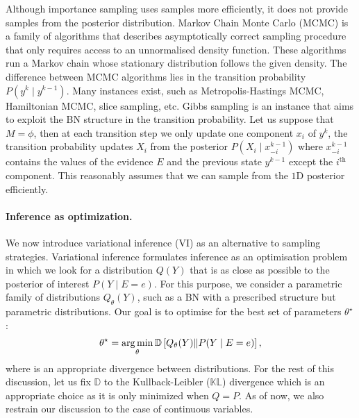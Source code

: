 Although importance sampling uses samples more efficiently, it does not provide samples from the posterior distribution. Markov Chain Monte Carlo (MCMC) is a family of algorithms that describes asymptotically correct sampling procedure that only requires access to an unnormalised density function. These algorithms run a Markov chain whose stationary distribution follows the given density. The difference between MCMC algorithms lies in the transition probability $P(y^k\mid y^{k-1})$. Many instances exist, such as Metropolis-Hastings MCMC, Hamiltonian MCMC, slice sampling, etc. Gibbs sampling is an instance that aims to exploit the BN structure in the transition probability. Let us suppose that $M = \phi$, then at each transition step we only update one component $x_i$ of $y^k$, the transition probability updates $X_i$ from the posterior $P(X_i\mid x_{-i}^{k-1})$ where $x_{-i}^{k-1}$ contains the values of the evidence $E$ and the previous state $y^{k-1}$ except the $i^{\text{th}}$ component. This reasonably assumes that we can sample from the $1$D posterior efficiently.


\paragraph{Inference as optimization.}
We now introduce variational inference (VI) as an alternative to sampling strategies. Variational inference formulates inference as an optimisation problem in which we look for a distribution $Q(Y)$ that is as close as possible to the posterior of interest $P(Y\mid E=e)$. For this purpose, we consider a parametric family of distributions $Q_\theta(Y)$, such as a BN with a prescribed structure but parametric distributions. Our goal is to optimise for the best set of parameters $\theta^\star$:
\begin{align}
  \theta^\star = \operatorname*{arg\,min}_\theta \mathbb{D}\left[Q_\theta(Y)\Vert P(Y\mid E=e) \right], \label{eq:obj_VI}
\end{align}
where is an appropriate divergence between distributions. For the rest of this discussion, let us fix $\mathbb{D}$ to the Kullback-Leibler ($\mathbb{KL}$) divergence which is an appropriate choice as it is only minimized when $Q = P$. As of now, we also restrain our discussion to the case of continuous variables.

